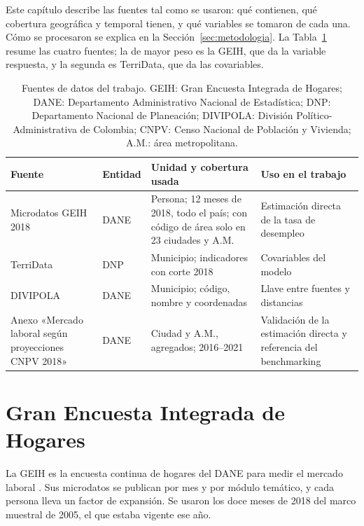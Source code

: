 
\label{sec:datos}

Este capítulo describe las fuentes tal como se usaron: qué contienen, qué cobertura geográfica y temporal tienen, y qué variables se tomaron de cada una. Cómo se procesaron se explica en la Sección~\ref{sec:metodologia}. La Tabla~\ref{tab:fuentes_datos} resume las cuatro fuentes; la de mayor peso es la GEIH, que da la variable respuesta, y la segunda es TerriData, que da las covariables.

\begin{table}[!htbp]
\centering
\small
\caption[Fuentes de datos del trabajo]{Fuentes de datos del trabajo. GEIH: Gran Encuesta Integrada de Hogares; DANE: Departamento Administrativo Nacional de Estadística; DNP: Departamento Nacional de Planeación; DIVIPOLA: División Político-Administrativa de Colombia; CNPV: Censo Nacional de Población y Vivienda; A.M.: área metropolitana.}
\label{tab:fuentes_datos}
\renewcommand{\arraystretch}{1.15}
\begin{tabularx}{\linewidth}{>{\raggedright\arraybackslash}p{2.6cm} >{\raggedright\arraybackslash}p{2.0cm} >{\raggedright\arraybackslash}X >{\raggedright\arraybackslash}p{3.6cm}}
\toprule
Fuente & Entidad & Unidad y cobertura usada & Uso en el trabajo \\
\midrule
Microdatos GEIH 2018 & DANE & Persona; 12 meses de 2018, todo el país; con código de área solo en 23 ciudades y A.M. & Estimación directa de la tasa de desempleo \\
TerriData & DNP & Municipio; indicadores con corte 2018 & Covariables del modelo \\
DIVIPOLA & DANE & Municipio; código, nombre y coordenadas & Llave entre fuentes y distancias \\
Anexo «Mercado laboral según proyecciones CNPV 2018» & DANE & Ciudad y A.M., agregados; 2016--2021 & Validación de la estimación directa y referencia del benchmarking \\
\bottomrule
\end{tabularx}
\end{table}

\section{Gran Encuesta Integrada de Hogares}
\label{sec:datos_geih}

La GEIH es la encuesta continua de hogares del DANE para medir el mercado laboral \cite[p.~3]{DANE_GEIH_Metodologia2016}. Sus microdatos se publican por mes y por módulo temático, y cada persona lleva un factor de expansión. Se usaron los doce meses de 2018 del marco muestral de 2005, el que estaba vigente ese año.

